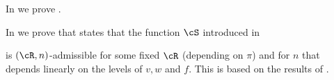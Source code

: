 \documentclass[12pt,a4paper]{amsart}%
\newcommand{\RamiA}[1]{{{#1}}}
\newcommand{\RamiF}[1]{{{#1}}}
\newcommand{\EitanC}[1]{{{#1}}}
\begin{document}
In  we prove . %

In  we prove 
 that states that 
\RamiA{the function $\cS$ introduced in } 

is $(\cR,n)$-admissible for some fixed $\cR$ (depending on $\pi$) and for $n$ that depends linearly on the \EitanC{level}\RamiF{s} of \RamiA{$v,w$} and $f$. This is based on the results of \cite{AGKS_eff_rep}.
\end{document}
